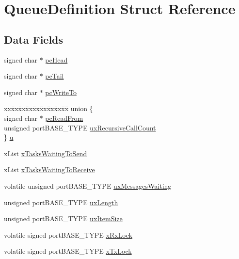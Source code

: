 \hypertarget{structQueueDefinition}{}\section{Queue\+Definition Struct Reference}
\label{structQueueDefinition}
\subsection*{Data Fields}
\begin{DoxyCompactItemize}
\item 
signed char $\ast$ \mbox{\hyperlink{structQueueDefinition_ae27bcbc6d35f837dedc62321501daa49}{pc\+Head}}
\item 
signed char $\ast$ \mbox{\hyperlink{structQueueDefinition_a107296146c82cd122e0ba0756fb89c9d}{pc\+Tail}}
\item 
signed char $\ast$ \mbox{\hyperlink{structQueueDefinition_a019aa270dc6be4b3d0ea3f32e6730529}{pc\+Write\+To}}
\item 
\begin{tabbing}
xx\=xx\=xx\=xx\=xx\=xx\=xx\=xx\=xx\=\kill
union \{\\
\>signed char $\ast$ \mbox{\hyperlink{structQueueDefinition_a6fd0b7b0b51bb9654cdf0899bdaa4936}{pcReadFrom}}\\
\>unsigned portBASE\_TYPE \mbox{\hyperlink{structQueueDefinition_a0582284771e9c079fa3276a31f3805ad}{uxRecursiveCallCount}}\\
\} \mbox{\hyperlink{structQueueDefinition_ab2c557f3e7a58a29bd07c3c62e7e568a}{u}}\\

\end{tabbing}\item 
x\+List \mbox{\hyperlink{structQueueDefinition_a073ad0a31a51508395efd54599c73ee1}{x\+Tasks\+Waiting\+To\+Send}}
\item 
x\+List \mbox{\hyperlink{structQueueDefinition_a3f26a41f0c0d17fc4645905b309b33aa}{x\+Tasks\+Waiting\+To\+Receive}}
\item 
volatile unsigned port\+B\+A\+S\+E\+\_\+\+T\+Y\+PE \mbox{\hyperlink{structQueueDefinition_a8e3b24b25631daa65cc8b860346013e3}{ux\+Messages\+Waiting}}
\item 
unsigned port\+B\+A\+S\+E\+\_\+\+T\+Y\+PE \mbox{\hyperlink{structQueueDefinition_af1edbb7426dad16a57e1fc6bb475bc7e}{ux\+Length}}
\item 
unsigned port\+B\+A\+S\+E\+\_\+\+T\+Y\+PE \mbox{\hyperlink{structQueueDefinition_ad8719a7d6da96299b7ed158a621ae7e5}{ux\+Item\+Size}}
\item 
volatile signed port\+B\+A\+S\+E\+\_\+\+T\+Y\+PE \mbox{\hyperlink{structQueueDefinition_a55d7241c91d75f3bf4ad4032aeaaf824}{x\+Rx\+Lock}}
\item 
volatile signed port\+B\+A\+S\+E\+\_\+\+T\+Y\+PE \mbox{\hyperlink{structQueueDefinition_a393aeeb16596b1be505014b57158c995}{x\+Tx\+Lock}}
\end{DoxyCompactItemize}


